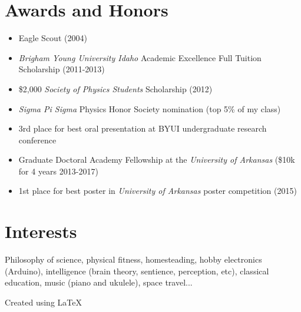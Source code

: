 \documentclass[10pt]{article}
\begin{document}
\section*{Awards and Honors}
\begin{itemize}
    \itemsep-0.5em
    \item Eagle Scout (2004)
    \item {\it Brigham Young University Idaho} Academic Excellence Full Tuition Scholarship (2011-2013)
    \item \$2,000 {\it Society of Physics Students} Scholarship (2012)
    \item {\it Sigma Pi Sigma} Physics Honor Society nomination (top 5\% of my class)
    \item 3rd place for best oral presentation at BYUI undergraduate research conference
    \item Graduate Doctoral Academy Fellowship at the {\it University of Arkansas}
        (\$10k for 4 years 2013-2017)
    \item 1st place for best poster in {\it University of Arkansas} poster competition (2015)
\end{itemize}

\section*{Interests}
Philosophy of science, physical fitness, homesteading, hobby electronics (Arduino),
intelligence (brain theory, sentience, perception, etc), classical education, music
(piano and ukulele), space travel...

{
    \vspace{20pt}
    \scriptsize\hfill Created using \LaTeX
}
\end{document}
